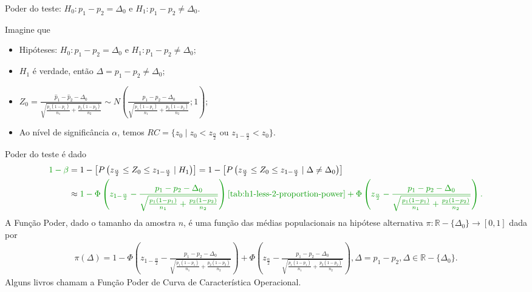 \documentclass[9pt]{beamer}
\begin{document}
\begin{frame}{Poder do teste: $H_0:p_1 - p_2 = \Delta_0$ e $H_1: p_1 - p_2 \neq \Delta_0$.}

\tiny

Imagine que
\begin{itemize}
	\item Hipóteses: $H_0: p_1 - p_2 = \Delta_0$ e $H_1: p_1 -  p_2 \neq \Delta_0$;
	\item $H_1$ é verdade, então $\Delta = p_1-p_2 \neq \Delta_0$;
	\item $Z_0 = \frac{\hat{p}_1 - \hat{p}_2 - \Delta_0}{\sqrt{ 
	\frac{p_1(1-p_1)}{n_1} + \frac{p_2(1-p_2)}{n_2} }} \sim N\left( \frac{p_1 - p_2 - \Delta_0}{\sqrt{\frac{p_1(1-p_1)}{n_1} + \frac{p_2(1-p_2)}{n_2}}};1 \right)$;
	\item Ao nível de significância $\alpha$, temos $RC = \{ z_0 \mid z_0 < z_{\frac{\alpha}{2}} \mbox{ ou } z_{1-\frac{\alpha}{2}} < z_0  \}$.
\end{itemize}
\vfill	

Poder do teste é dado
\begin{align*}
\textcolor{important}{1-\beta} &=1 - \left[P\left( z_{\frac{\alpha}{2}} \leq Z_0 \leq z_{1-\frac{\alpha}{2}} \mid H_1 \right)\right] = 1 - \left[P\left( z_{\frac{\alpha}{2}} \leq Z_0 \leq z_{1-\frac{\alpha}{2}} \mid \Delta \neq \Delta_0 \right)\right]\\
&\approx \textcolor{important}{1 - \Phi\left( z_{1-\frac{\alpha}{2}} - \frac{p_1-p_2 - \Delta_0}{\sqrt{\frac{p_1(1-p_1)}{n_1} + \frac{p_2(1-p_2)}{n_2}}} \right)\ref{tab:h1-less-2-proportion-power} + \Phi\left( z_{\frac{\alpha}{2}} - \frac{p_1-p_2 - \Delta_0}{\sqrt{\frac{p_1(1-p_1)}{n_1} + \frac{p_2(1-p_2)}{n_2}}} \right).}
\end{align*}
A \textcolor{important}{Função Poder}, dado o tamanho da amostra $n$, é uma função das médias populacionais na hipótese alternativa  $\pi: \mathbb{R} - \{\Delta_0\} \longrightarrow [0,1]$ dada por
\begin{align*}
\pi(\Delta) = 1 - \Phi\left( z_{1-\frac{\alpha}{2}} - \frac{p_1-p_2 - \Delta_0}{\sqrt{\frac{p_1(1-p_1)}{n_1} + \frac{p_2(1-p_2)}{n_2}}} \right) + \Phi\left( z_{\frac{\alpha}{2}} - \frac{p_1-p_2 - \Delta_0}{\sqrt{\frac{p_1(1-p_1)}{n_1} + \frac{p_2(1-p_2)}{n_2}}} \right), \Delta = p_1 - p_2, \Delta \in \mathbb{R} - \{\Delta_0 \}.
\end{align*}
Alguns livros chamam a Função Poder de \textcolor{important}{Curva de Característica Operacional.}

\normalsize

\end{frame}
\end{document}
